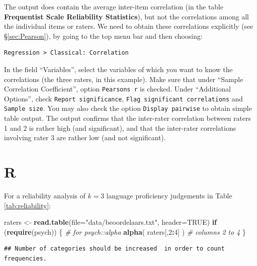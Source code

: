 \documentclass[
]{book}
\newenvironment{Shaded}{\begin{snugshade}}{\end{snugshade}}
\newcommand{\AttributeTok}[1]{\textcolor[rgb]{0.13,0.29,0.53}{#1}}
\newcommand{\CommentTok}[1]{\textcolor[rgb]{0.56,0.35,0.01}{\textit{#1}}}
\newcommand{\ConstantTok}[1]{\textcolor[rgb]{0.56,0.35,0.01}{#1}}
\newcommand{\ControlFlowTok}[1]{\textcolor[rgb]{0.13,0.29,0.53}{\textbf{#1}}}
\newcommand{\DecValTok}[1]{\textcolor[rgb]{0.00,0.00,0.81}{#1}}
\newcommand{\FunctionTok}[1]{\textcolor[rgb]{0.13,0.29,0.53}{\textbf{#1}}}
\newcommand{\NormalTok}[1]{#1}
\newcommand{\OtherTok}[1]{\textcolor[rgb]{0.56,0.35,0.01}{#1}}
\newcommand{\SpecialCharTok}[1]{\textcolor[rgb]{0.81,0.36,0.00}{\textbf{#1}}}
\newcommand{\StringTok}[1]{\textcolor[rgb]{0.31,0.60,0.02}{#1}}
\begin{document}
The output does contain the average inter-item correlation (in the table \textbf{Frequentist Scale Reliability Statistics}), but not the correlations among all the individual items or raters.
We need to obtain these correlations explicitly (see §\ref{sec:Pearson}), by going to the top menu bar and then choosing:

\begin{verbatim}
Regression > Classical: Correlation
\end{verbatim}

In the field ``Variables'', select the variables of which you want to know the correlations (the three raters, in this example).
Make sure that under ``Sample Correlation Coefficient'', option \texttt{Pearson\textquotesingle{}s\ r} is checked.
Under ``Additional Options'', check \texttt{Report\ significance}, \texttt{Flag\ significant\ correlations} and \texttt{Sample\ size}. You may also check the option \texttt{Display\ pairwise} to obtain simple table output. The output confirms that the inter-rater correlation between raters 1 and 2 is rather high (and significant), and that the inter-rater correlations involving rater 3 are rather low (and not significant).

\hypertarget{r-11}{%
\section{R}\label{r-11}}

For a reliability analysis of \(k=3\) language proficiency
judgements in Table \ref{tab:reliability}:\\

\begin{Shaded}
\begin{Highlighting}[]
\NormalTok{raters }\OtherTok{\textless{}{-}} \FunctionTok{read.table}\NormalTok{(}\AttributeTok{file=}\StringTok{"data/beoordelaars.txt"}\NormalTok{, }\AttributeTok{header=}\ConstantTok{TRUE}\NormalTok{)}
\ControlFlowTok{if}\NormalTok{ (}\FunctionTok{require}\NormalTok{(psych)) \{ }\CommentTok{\# for psych::alpha}
  \FunctionTok{alpha}\NormalTok{( raters[,}\DecValTok{2}\SpecialCharTok{:}\DecValTok{4}\NormalTok{] ) }\CommentTok{\# columns 2 to 4}
\NormalTok{\}}
\end{Highlighting}
\end{Shaded}

\begin{verbatim}
## Number of categories should be increased  in order to count frequencies.
\end{verbatim}
\end{document}
